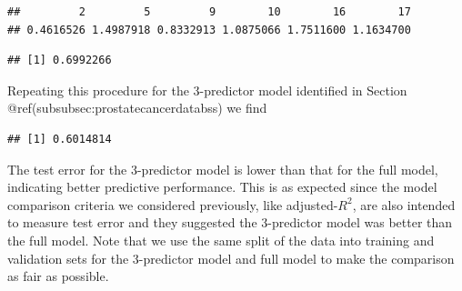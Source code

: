 \documentclass[
]{article}
\newenvironment{Shaded}{\begin{snugshade}}{\end{snugshade}}
\newcommand{\AttributeTok}[1]{\textcolor[rgb]{0.13,0.29,0.53}{#1}}
\newcommand{\DecValTok}[1]{\textcolor[rgb]{0.00,0.00,0.81}{#1}}
\newcommand{\DocumentationTok}[1]{\textcolor[rgb]{0.56,0.35,0.01}{\textbf{\textit{#1}}}}
\newcommand{\FunctionTok}[1]{\textcolor[rgb]{0.13,0.29,0.53}{\textbf{#1}}}
\newcommand{\NormalTok}[1]{#1}
\newcommand{\OtherTok}[1]{\textcolor[rgb]{0.56,0.35,0.01}{#1}}
\newcommand{\SpecialCharTok}[1]{\textcolor[rgb]{0.81,0.36,0.00}{\textbf{#1}}}
\begin{document}
\begin{verbatim}
##         2         5         9        10        16        17 
## 0.4616526 1.4987918 0.8332913 1.0875066 1.7511600 1.1634700
\end{verbatim}

\begin{Shaded}
\end{Shaded}

\begin{verbatim}
## [1] 0.6992266
\end{verbatim}

Repeating this procedure for the 3-predictor model identified in Section
@ref(subsubsec:prostatecancerdatabss) we find

\begin{Shaded}
\end{Shaded}

\begin{verbatim}
## [1] 0.6014814
\end{verbatim}

The test error for the 3-predictor model is lower than that for the full
model, indicating better predictive performance. This is as expected
since the model comparison criteria we considered previously, like
adjusted-\(R^2\), are also intended to measure test error and they
suggested the 3-predictor model was better than the full model. Note
that we use the same split of the data into training and validation sets
for the 3-predictor model and full model to make the comparison as fair
as possible.
\end{document}
